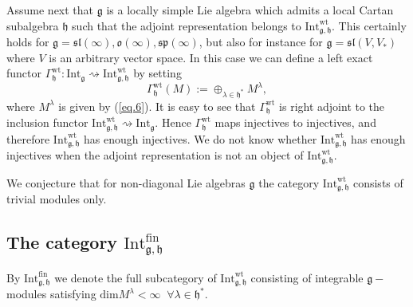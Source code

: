 \documentclass[10pt]{amsart}
\newcommand{\wt}{\mathrm{wt}}
\renewcommand{\sp}{\mathfrak{sp}}
\renewcommand{\sl}{\mathfrak{sl}}
\newcommand{\oo}{\mathfrak{o}}
\newcommand{\hh}{\mathfrak{h}}
\renewcommand{\gg}{\mathfrak{g}}
\newcommand{\Int}{\mathrm{Int}}
\newcommand{\fin}{\mathrm{fin}}
\begin{document}
Assume next that $\gg$ is a locally simple Lie algebra which admits a
local Cartan subalgebra $\hh$ such that the adjoint representation
belongs to  $\Int^{\wt}_{\gg,\hh}$. This certainly holds for 
$\gg = \sl(\infty),\oo(\infty),\sp(\infty)$, but also for instance for 
$\gg = \sl(V,V_*)$ where $V$ is an arbitrary vector space. 
In this case we can define a left exact functor 
$\Gamma_\hh^\wt:\mathrm{Int}_{\gg}\rightsquigarrow\mathrm{Int}^{\wt}_{\gg,\hh}$ by setting
\begin{equation}\label{eq.7}
\Gamma_\hh^\wt(M):=\oplus_{\lambda\in\hh^*} M^{\lambda},
\end{equation}
where $ M^{\lambda}$ is given by (\ref{eq.6}). It is easy to see that $\Gamma_\hh^\wt$ is right adjoint to the inclusion functor $\mathrm{Int}^{\wt}_{\gg,\hh}\rightsquigarrow\mathrm{Int}_{\gg}$. Hence $\Gamma_\hh^\wt$ maps injectives to injectives, and therefore $\mathrm{Int}^{\wt}_{\gg,\hh}$ has enough injectives. We do not know whether $\Int^{\wt}_{\gg,\hh}$ has enough injectives when the adjoint representation is not an object of $\mathrm{Int}^{\wt}_{\gg,\hh}$.

We conjecture that for non-diagonal Lie algebras $\gg$ the category $\mathrm{Int}^{\wt}_{\gg,\hh}$ consists of trivial modules only. 

\subsection {The category  $\mathrm{Int}_{\gg,\hh}^\fin$}\label{sect:3.3}

By $\mathrm{Int}_{\gg,\hh}^\fin$ we denote the full subcategory of $\mathrm{Int}^{\wt}_{\gg,\hh}$ consisting of integrable $\gg-$modules satisfying 
$\mathrm{dim}M^{\lambda} < \infty \;\;\forall \lambda \in \hh^*$. 

\end{document}
